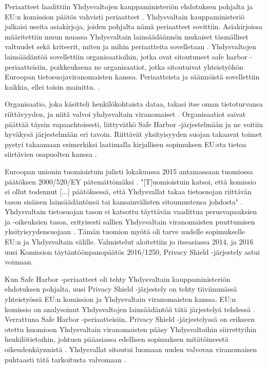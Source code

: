 \documentclass[finnish]{tktltiki}
\begin{document}
Periaatteet laadittiin Yhdysvaltojen kauppaministeriön ehdotuksen pohjalta \cite{safeharbor,tikkinen}ja EU:n komission päätös vahvisti periaatteet \cite{safeharbor}. Yhdysvaltain kauppaministeriö julkaisi useita asiakirjoja, joiden pohjalta nämä periaatteet sovittiin. Asiakirjoissa määritettiin muun muassa Yhdysvaltain lainsäädäännön mukaiset täsmälliset valtuudet sekä kriteerit, miten ja mihin periaatteita sovelletaan \cite{safeharbor}. Yhdysvaltojen lainsäädäntöä sovellettiin organisaatioihin, jotka ovat sitoutuneet safe harbor -periaatteisiin, poikkeuksena ne organisaatiot, jotka sitoutuivat yhteistyöhön Euroopan tietosuojaviranomaisten kanssa. Periaatteista ja säännöistä sovellettiin kaikkia, ellei toisin mainittu. \cite{safeharbor}.

Organisaatio, joka käsitteli henkilökohtaista dataa, takasi itse oman tietoturvansa riittävyyden, ja niitä valvoi yhdysvaltain viranomaiset \cite{safeharbor,tikkinen}. Organisaatiot saivat päättää täysin vapaaehtoisesti, liittyvätkö Safe Harbor -järjestelmään ja ne voitiin hyväkysä järjestelmään eri tavoin. Riittävät yksityisyyden suojan takaavat toimet pystyi takaamaan esimerkiksi laatimalla kirjallisen sopimuksen EU:sta tietoa siirtävien osapuolten kanssa \cite{safeharbor}.

Euroopan unionin tuomioistuin julisti lokakuussa 2015 antamassaan tuomiossa päätöksen 2000/520/EY pätemättömäksi \cite{privacy}. "[T]uomioistuin katsoi, että komissio ei ollut todennut [...] päätöksessä, että Yhdysvallat takaa tietosuojan riittävän tason sisäisen lainsäädäntönsä tai kansainvälisten sitoumustensa johdosta" \cite{privacy}. Yhdysvaltain tietosuojan tason ei katsottu täyttävän vaadittua perusvapauksien ja -oikeuksien tasoa, erityisesti sallien Yhdysvaltain viranomaisten puuttumisen yksityisyydensuojaan \cite{privacy,tikkinen}. Tämän tuomion myötä oli tarve uudelle sopimukselle EU:n ja Yhdysvaltain välille. Valmistelut aloitettiin jo itseasiassa 2014, ja 2016 uusi Komission täytäntöönpanopäätös 2016/1250, Privacy Shield -järjestely astui voimaan.

Kun Safe Harbor -periaatteet oli tehty Yhdysvaltain kauppaministeriön ehdotuksen pohjalta, uusi Privacy Shield -järjestely on tehty tiiviimmässä yhteistyössä EU:n komission ja Yhdysvaltain viranomaisten kanssa. EU:n komissio on analysoinut Yhdysvaltojen lainsäädäntöä tätä järjestelyä tehdessä \cite{privacy}. Verrattuna Safe Harbor -periaatteisiin, Privacy Shield -järjestelyssä on erikseen otettu huomioon Yhdysvaltain viranomaisten pääsy Yhdysvaltoihin siirrettyihin henkilötietoihin, johtuen pääasiassa edellisen sopimuksen mitätöineestä oikeudenkäynnistä \cite{privacy,tikkinen}. Yhdysvallat sitoutui luomaan uuden valvovan viranomaisen puhtaasti tätä tarkoitusta valvomaan \cite{safeharbor}.
\end{document}

